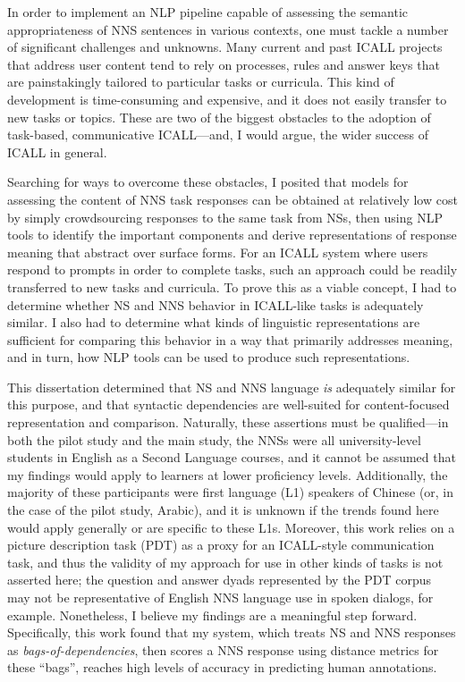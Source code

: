 In order to implement an NLP pipeline capable of assessing the semantic appropriateness of NNS sentences in various contexts, one must tackle a number of significant challenges and unknowns. Many current and past ICALL projects that address user content tend to rely on processes, rules and answer keys that are painstakingly tailored to particular tasks or curricula. This kind of development is time-consuming and expensive, and it does not easily transfer to new tasks or topics. These are two of the biggest obstacles to the adoption of task-based, communicative ICALL---and, I would argue, the wider success of ICALL in general. 

Searching for ways to overcome these obstacles, I posited that models for assessing the content of NNS task responses can be obtained at relatively low cost by simply crowdsourcing responses to the same task from NSs, then using NLP tools to identify the important components and derive representations of response meaning that abstract over surface forms. For an ICALL system where users respond to prompts in order to complete tasks, such an approach could be readily transferred to new tasks and curricula. To prove this as a viable concept, I had to determine whether NS and NNS behavior in ICALL-like tasks is adequately similar. I also had to determine what kinds of linguistic representations are sufficient for comparing this behavior in a way that primarily addresses meaning, and in turn, how NLP tools can be used to produce such representations.

This dissertation determined that NS and NNS language \textit{is} adequately similar for this purpose, and that syntactic dependencies are well-suited for content-focused representation and comparison. Naturally, these assertions must be qualified---in both the pilot study and the main study, the NNSs were all university-level students in English as a Second Language courses, and it cannot be assumed that my findings would apply to learners at lower proficiency levels. Additionally, the majority of these participants were first language (L1) speakers of Chinese (or, in the case of the pilot study, Arabic), and it is unknown if the trends found here would apply generally or are specific to these L1s. Moreover, this work relies on a picture description task (PDT) as a proxy for an ICALL-style communication task, and thus the validity of my approach for use in other kinds of tasks is not asserted here; the question and answer dyads represented by the PDT corpus may not be representative of English NNS language use in spoken dialogs, for example. Nonetheless, I believe my findings are a meaningful step forward. Specifically, this work found that my system, which treats NS and NNS responses as \textit{bags-of-dependencies}, then scores a NNS response using distance metrics for these ``bags'', reaches high levels of accuracy in predicting human annotations.

